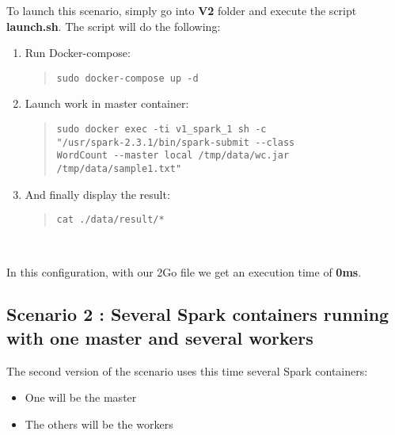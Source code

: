 \documentclass{article}
\begin{document}
\noindent To launch this scenario, simply go into \textbf{V2} folder and execute the script \textbf{launch.sh}. The script will do the following:
\begin{enumerate}
    \item Run Docker-compose:
    \begin{quote}
\begin{verbatim}
sudo docker-compose up -d
\end{verbatim}
    \end{quote}
    
    \item Launch work in master container:
    \begin{quote}
\begin{verbatim}
sudo docker exec -ti v1_spark_1 sh -c 
"/usr/spark-2.3.1/bin/spark-submit --class 
WordCount --master local /tmp/data/wc.jar 
/tmp/data/sample1.txt"
\end{verbatim}
    \end{quote}
    
    \item And finally display the result:
    \begin{quote}
\begin{verbatim}
cat ./data/result/*
\end{verbatim}
    \end{quote}
\end{enumerate}
\ \

\noindent In this configuration, with our 2Go file we get an execution time of \textbf{0ms}.



\subsection{Scenario 2 : Several Spark containers running with one master and several workers}

The second version of the scenario uses this time several Spark containers:
\begin{itemize}
  \item One will be the master
  \item The others will be the workers
\end{itemize}
\ \
\end{document}
